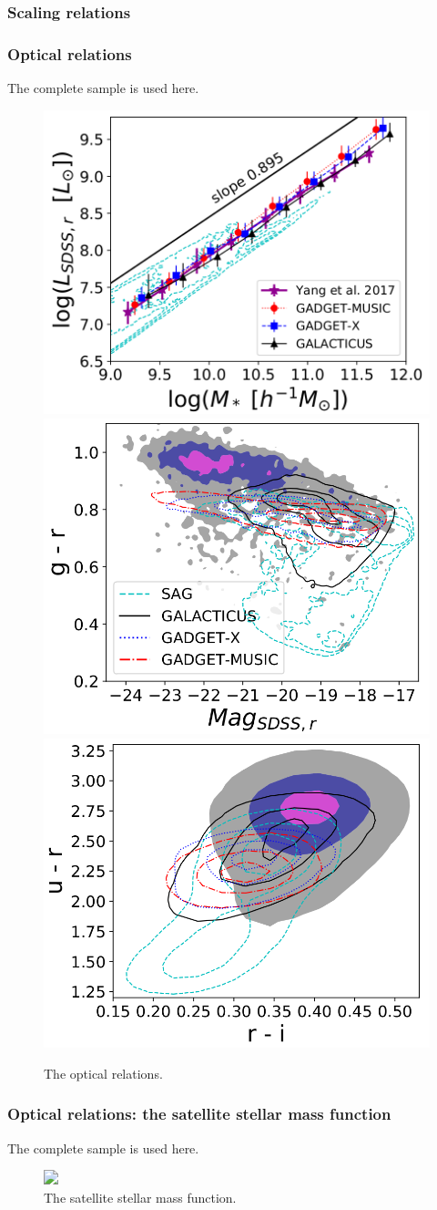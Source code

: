 \documentclass[aspectratio=43]{beamer}
\begin{document}
\subsubsection{Scaling relations}
\begin{frame}
  \frametitle{Optical relations}
  The complete sample is used here.
  \begin{figure}
    \includegraphics[width=0.33\linewidth]{Optical-relation1}
    \includegraphics[width=0.32\linewidth]{Optical-relation2}
    \includegraphics[width=0.32\linewidth]{Optical-relation3}
    \vspace{-0.3cm}
    \caption{The optical relations.  }
  \end{figure}
\end{frame}
\begin{frame}
  \frametitle{Optical relations: the satellite stellar mass function}
  The complete sample is used here.
  \begin{figure}
    \includegraphics<1>[width=0.7\linewidth]{Ssmf}
    \vspace{-0.6cm}
    \caption{The satellite stellar mass function.  }
  \end{figure}
\end{frame}
\end{document}
